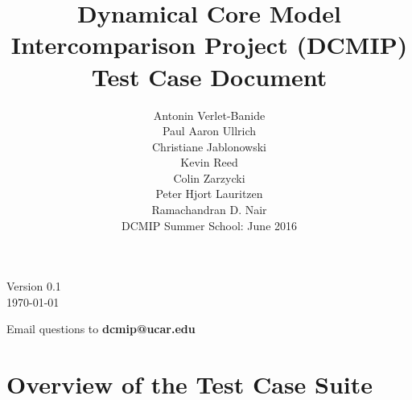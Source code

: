 \documentclass[times,doublespace]{fldauth}
\begin{document}
\setcounter{section}{-1}

\title{Dynamical Core Model Intercomparison Project (DCMIP) \\
 Test Case Document}
\author{Antonin Verlet-Banide\\ Paul Aaron Ullrich \\Christiane Jablonowski \\ Kevin Reed \\ Colin Zarzycki \\ Peter Hjort Lauritzen \\ Ramachandran D. Nair \\ \vspace{3cm} DCMIP Summer School: June 2016}

\maketitle

\begin{center}
Version 0.1 \\
\today
\end{center}

\vspace{2cm}

\begin{center}
Email questions to \textbf{dcmip@ucar.edu}
\end{center}

\clearpage

\section*{Overview of the Test Case Suite}
\end{document}
